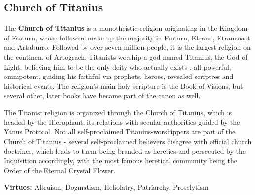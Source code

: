 \subsection{Church of Titanius}


The \textbf{Church of Titanius} is a monotheistic religion originating in the Kingdom of Froturn, whose followers make up the majority in Froturn, Etrand, Etrancoast and Artaburro. Followed by over seven million people, it is the largest religion on the continent of Artograch. Titanists worship a god named Titanius, the God of Light, believing him to be the only deity who actually exists , all-powerful, omnipotent, guiding his faithful via prophets, heroes, revealed scriptres and historical events. The religion's main holy scripture is the Book of Visions, but several other, later books have became part of the canon as well.

The Titanist religion is organized through the Church of Titanius, which is headed by the Hierophant, its relations with secular authorities guided by the Yanus Protocol. Not all self-proclaimed Titanius-worshippers are part of the Church of Titanius - several self-proclaimed believers disagree with official church doctrines, which leads to them being branded as heretics and persecuted by the Inquisition accordingly, with the most famous heretical community being the Order of the Eternal Crystal Flower. 

\textbf{Virtues:} Altruism, Dogmatism, Heliolatry, Patriarchy, Proselytism

